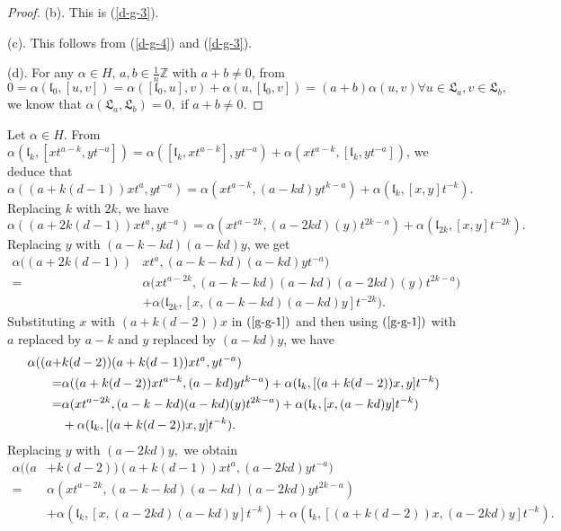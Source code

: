 \documentclass[1p]{elsarticle}
\numberwithin{equation}{section}
\def\fL{\mathfrak{L}}
\def\bZ{\mathbb{Z}}
\def\fl{\mathfrak{l}}
\begin{document}
\begin{proof}
 (b). This is (\ref{d-g-3}).

 (c). This follows from (\ref{d-g-4}) and (\ref{d-g-3}).

 (d). For any $\alpha\in H$,   $a,b\in \frac 1n \bZ$ with $a+b\ne0$, from $$0=\alpha(\fl_0,[u,v])=\alpha([\fl_0,u],v)+\alpha(u,[\fl_0,v])=(a+b)\alpha(u,v)\forall u\in \fL_a,v\in \fL_b,$$ we know that $\alpha(\fL_a,\fL_b)=0,$ if $ a+b\ne 0$.
 \end{proof}



Let  $\alpha\in H$. From $\alpha(\fl_{k},[xt^{a-k},yt^{-a}])=\alpha([\fl_{k},xt^{a-k}],yt^{-a})+\alpha(xt^{a-k},[\fl_{k},yt^{-a}])$, we deduce that
\begin{equation}\label{g-g-1}\alpha((a+k(d-1))xt^a,yt^{-a})=\alpha(xt^{a-k},(a-kd)yt^{k-a})+\alpha(\fl_{k},[x,y]t^{-k}).\end{equation}
Replacing $k$ with $2k$, we have $$\alpha((a+2k(d-1))xt^a,yt^{-a})=\alpha(xt^{a-2k},(a-2kd)(y)t^{2k-a})+\alpha(\fl_{2k},[x,y]t^{-2k}).$$
Replacing $y$ with $(a-k-kd)(a-kd)y$, we get
\begin{equation}\label{eq-1}\begin{aligned}\alpha\big((a+2k(d-1))&xt^a,(a-k-kd)(a-kd)yt^{-a}\big)\\ =&\alpha\big(xt^{a-2k},(a-k-kd)(a-kd)(a-2kd)(y)t^{2k-a}\big)\\
		&+\alpha\big(\fl_{2k},[x,(a-k-kd)(a-kd)y]t^{-2k}\big).\end{aligned}\end{equation}
Substituting $x$ with $(a+k(d-2)) x$ in
 $(\ref{g-g-1})$ and then using $(\ref{g-g-1})$ with $a$ replaced by $a-k$ and $y$ replaced by $(a-kd)y$, we have $$\aligned \alpha((a+&k(d-2))(a+k(d-1))xt^a,yt^{-a})\\=&\alpha((a+k(d-2))xt^{a-k},(a-kd)yt^{k-a})+\alpha(\fl_{k},[(a+k(d-2))x,y]t^{-k})\\
=&\alpha(xt^{a-2k},(a-k-kd)(a-kd)(y)t^{2k-a})+\alpha(\fl_{k},[x,(a-kd)y]t^{-k})\\
&+\alpha(\fl_{k},[(a+k(d-2))x,y]t^{-k}).\endaligned $$ Replacing $y$ with $(a-2kd)y,$ we obtain
\begin{equation}\label{eq-2}\begin{aligned}\alpha((a&+k(d-2))(a+k(d-1))xt^a,(a-2kd)yt^{-a})\\
=&\alpha(xt^{a-2k},(a-k-kd)(a-kd)(a-2kd)yt^{2k-a})\\&+\alpha(\fl_{k},[x,(a-2kd)(a-kd)y]t^{-k})+\alpha(\fl_{k},[(a+k(d-2))x,(a-2kd)y]t^{-k}).\end{aligned}\end{equation}
\end{document}
